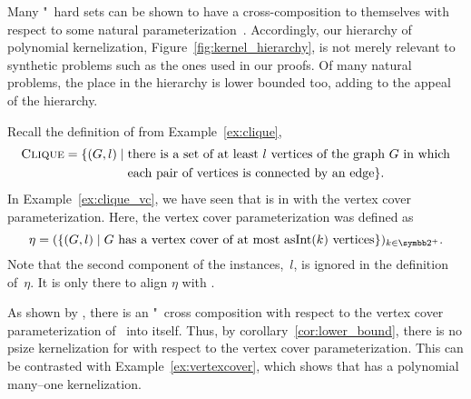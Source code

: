 Many "~hard sets can be shown to have a cross-composition to themselves with respect to some natural parameterization~\parencite{bodlaender2014kernelization,fomin2019kernelization}.
Accordingly, our hierarchy of polynomial kernelization, Figure~\ref{fig:kernel_hierarchy}, is not merely relevant to synthetic problems such as the ones used in our proofs.
Of many natural problems, the place in the hierarchy is lower bounded too, adding to the appeal of the hierarchy.

\begin{example}
  Recall the definition of  from Example~\ref{ex:clique},
  \begin{align*}
    \textnormal{\textsc{Clique}} = \{(G, l) \;|\; &\text{there is a set of at least $l$ vertices of the graph $G$ in which} \\
      &\text{each pair of vertices is connected by an edge}\}.
  \end{align*}
  In Example~\ref{ex:clique_vc}, we have seen that  is in  with the vertex cover parameterization.
  Here, the vertex cover parameterization was defined as
  \begin{equation*}
    \eta \deq (\{(G, l) \st \text{$G$ has a vertex cover of at most $\asNat(k)$ vertices}\})_{k \in \binary^+}.
  \end{equation*}
  Note that the second component of the instances,~$l$, is ignored in the definition of~$\eta$.
  It is only there to align $\eta$ with .

  As shown by \textcite[Section~17.3.2]{fomin2019kernelization}, there is an "~cross composition with respect to the vertex cover parameterization of~ into itself.
  Thus, by corollary~\ref{cor:lower_bound}, there is no psize kernelization for  with respect to the vertex cover parameterization.
  This can be contrasted with Example~\ref{ex:vertexcover}, which shows that  has a polynomial many--one kernelization.
\end{example}

